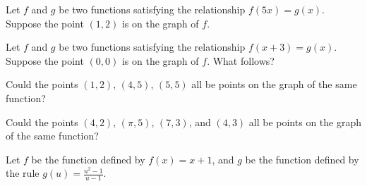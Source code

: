 \documentclass{ximera}
\begin{document}
\begin{shuffle}
\begin{problem}
  Let $f$ and $g$ be two functions satisfying the relationship $f(5x)
  = g(x)$.  Suppose the point $(1,2)$ is on the graph of $f$.
  \begin{multipleChoice}
  \end{multipleChoice}
\end{problem}

\begin{problem}
  Let $f$ and $g$ be two functions satisfying the relationship $f(x+3)
  = g(x)$.  Suppose the point $(0,0)$ is on the graph of $f$. What
  follows?
	\begin{multipleChoice}
	\end{multipleChoice}
\end{problem}

\begin{problem}
  Could the points $(1,2)$, $(4,5)$, $(5,5)$ all be points on the
  graph of the same function?
  \begin{multipleChoice}
  \end{multipleChoice}
\end{problem}

\begin{problem}
  Could the points $(4,2)$, $(\pi,5)$, $(7,3)$, and $(4,3)$ all
  be points on the graph of the same function?
  \begin{multipleChoice}
  \end{multipleChoice}
\end{problem}

\begin{problem}
  Let $f$ be the function defined by $f(x) = x+1$, and $g$ be the
  function defined by the rule $g(u) = \frac{u^2-1}{u-1}$.
  \begin{multipleChoice}
  \end{multipleChoice}
\end{problem}



\end{shuffle}
\end{document}
